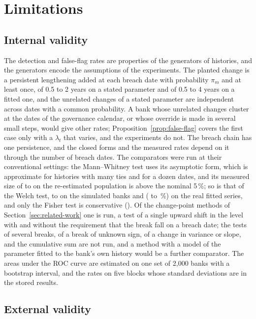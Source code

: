 \section{Limitations}
\label{sec:limitations}

\subsection{Internal validity}
\label{sec:lim-internal}

The detection and false-flag rates are properties of the generators of histories, and the generators encode the assumptions of the experiments. The planted change is a persistent lengthening added at each breach date with probability $\pi_m$ and at least once, of 0.5 to 2 years on a stated parameter and of 0.5 to 4 years on a fitted one, and the unrelated changes of a stated parameter are independent across dates with a common probability. A bank whose unrelated changes cluster at the dates of the governance calendar, or whose override is made in several small steps, would give other rates; Proposition~\ref{prop:false-flag} covers the first case only with a $\lambda_t$ that varies, and the experiments do not. The breach chain has one persistence, and the closed forms and the measured rates depend on it through the number of breach dates. The comparators were run at their conventional settings: the Mann--Whitney test uses its asymptotic form, which is approximate for histories with many ties and for a dozen dates, and its measured size of \fitNullAMw{} to \fitNullCMw{} on the re-estimated population is above the nominal 5\,\%; so is that of the Welch test, \fitNullCWelch{} to \fitNullAWelch{} on the simulated banks and \realNullWelch{} (\realNullLoWelch{} to \realNullHiWelch{}\,\%) on the real fitted series, and only the Fisher test is conservative (\fitNullFisher{}). Of the change-point methods of Section~\ref{sec:related-work} one is run, a test of a single upward shift in the level with and without the requirement that the break fall on a breach date; the tests of several breaks, of a break of unknown sign, of a change in variance or slope, and the cumulative sum are not run, and a method with a model of the parameter fitted to the bank's own history would be a further comparator. The areas under the ROC curve are estimated on one set of 2,000 banks with a bootstrap interval, and the rates on five blocks whose standard deviations are in the stored results.

\subsection{External validity}
\label{sec:lim-external}

